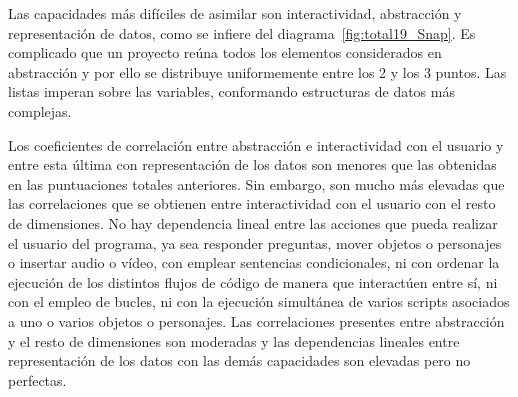 \documentclass[a4paper, 12pt]{book}
\begin{document}
Las capacidades más difíciles de asimilar son interactividad, abstracción y representación de datos, como se infiere del diagrama~\ref{fig:total19_Snap}. Es complicado que un proyecto reúna todos los elementos considerados en abstracción y por ello se distribuye uniformemente entre los 2 y los 3 puntos. Las listas imperan sobre las variables, conformando estructuras de datos más complejas. 

Los coeficientes de correlación entre abstracción e interactividad con el usuario y entre esta última con representación de los datos son menores que las obtenidas en las puntuaciones totales anteriores. Sin embargo, son mucho más elevadas que las correlaciones que se obtienen entre interactividad con el usuario con el resto de dimensiones. No hay dependencia lineal entre las acciones que pueda realizar el usuario del programa, ya sea responder preguntas, mover objetos o personajes o insertar audio o vídeo, con emplear sentencias condicionales, ni con ordenar la ejecución de los distintos flujos de código de manera que interactúen entre sí, ni con el empleo de bucles, ni con la ejecución simultánea de varios scripts asociados a uno o varios objetos o personajes. Las correlaciones presentes entre abstracción y el resto de dimensiones son moderadas y las dependencias lineales entre representación de los datos con las demás capacidades son elevadas pero no perfectas.
\end{document}
